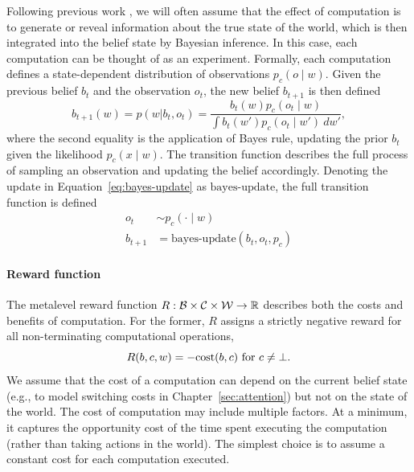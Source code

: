 Following previous work \citep{matheson1968economic,hay2012selecting}, we will often assume that the effect of computation is to generate or reveal information about the true state of the world, which is then integrated into the belief state by Bayesian inference. In this case, each computation can be thought of as an experiment. Formally, each computation defines a state-dependent distribution of observations $p_c(o \mid w)$. Given the previous belief $b_t$ and the observation $o_t$, the new belief $b_{t+1}$ is then defined
%
\begin{equation}\label{eq:bayes-update}
  b_{t+1}(w) = p(w | b_t, o_t) = \frac{b_t(w) p_c(o_t \mid w)}{
    \displaystyle\int b_t(w') p_c(o_t \mid w') \ dw'
  },
\end{equation}
%
where the second equality is the application of Bayes rule, updating the prior $b_t$ given the likelihood $p_c(x \mid w)$. The transition function describes the full process of sampling an observation and updating the belief accordingly. Denoting the update in Equation~\ref{eq:bayes-update} as $\text{bayes-update}$, the full transition function is defined
%
\begin{align}
  o_t &\sim p_c(\cdot \mid w) \\
  b_{t+1} &= \text{bayes-update}(b_t, o_t, p_c)
\end{align}



\paragraph{Reward function}
The metalevel reward function $R: \mathcal{B} \times \mathcal{C} \times \mathcal{W} \rightarrow \mathbb{R}$ describes both the costs and benefits of computation. For the former, $R$ assigns a strictly negative reward for all non-terminating computational operations,
%
\begin{equation}
R(b, c, w) = -\text{cost}(b, c) \text{ for } c \neq \bot.
\end{equation}
%
We assume that the cost of a computation can depend on the current belief state (e.g., to model switching costs in Chapter~\ref{sec:attention}) but not on the state of the world. The cost of computation may include multiple factors. At a minimum, it captures the opportunity cost of the time spent executing the computation (rather than taking actions in the world). The simplest choice is to assume a constant cost for each computation executed.

